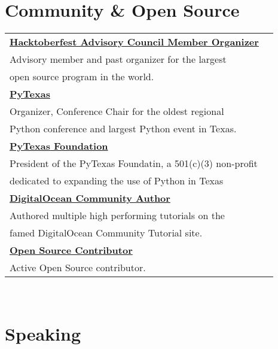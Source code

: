 \documentclass[10pt]{article} %
\newcommand\tab[1][1cm]{\hspace*{#1}}
\begin{document}
\begin{minipage}[t]{0.44\textwidth}
\section{Community \& Open Source}

\begin{tabular}{ll}
\textbf{\href{https://hacktoberfest.digitalocean.com/}{Hacktoberfest  Advisory Council Member Organizer}}\\
\tab Advisory member and past organizer for the largest  \\
\tab open source program in the world. \\

\textbf{\href{https://pytexas.org}{PyTexas}}\\
\tab Organizer, Conference Chair for the oldest regional   \\
\tab Python conference and largest Python event in Texas. \\

\textbf{\href{https://pytexas.org}{PyTexas Foundation}}\\
\tab President of the PyTexas Foundatin, a 501(c)(3) non-profit   \\
\tab dedicated to expanding the use of Python in Texas \\

\textbf{\href{https://www.digitalocean.com/community/users/masonegger?subtype=tutorial}{DigitalOcean Community Author}}\\
\tab Authored multiple high performing tutorials on the  \\
\tab famed DigitalOcean Community Tutorial site. \\

\textbf{\href{https://github.com/masonegger}{Open Source Contributor}}\\
\tab Active Open Source contributor. \\

\end{tabular}\\

\section{Speaking} 

\begin{tabular}{ll}


\end{tabular}
\end{minipage}
\end{document}
